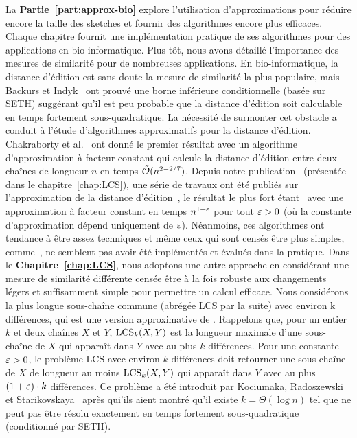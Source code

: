 La \textbf{Partie~\ref{part:approx-bio}} explore l'utilisation d'approximations pour réduire encore la taille des sketches et fournir des algorithmes encore plus efficaces. Chaque chapitre fournit une implémentation pratique de ses algorithmes pour des applications en bio-informatique.
%
Plus tôt, nous avons détaillé l'importance des mesures de similarité pour de nombreuses applications.
%
En bio-informatique, la distance d'édition est sans doute la mesure de similarité la plus populaire, mais Backurs et Indyk~\cite{DBLP:conf/stoc/BackursI15} ont prouvé une borne inférieure conditionnelle (basée sur SETH) suggérant qu'il est peu probable que la distance d'édition soit calculable en temps fortement sous-quadratique.
%
La nécessité de surmonter cet obstacle a conduit à l'étude d'algorithmes approximatifs pour la distance d'édition. Chakraborty et al.~\cite{DBLP:conf/focs/ChakrabortyDGKS18} ont donné le premier résultat  avec un algorithme d'approximation à facteur constant qui calcule la distance d'édition entre deux chaînes de longueur $n$ en temps $\tilde{\mathcal{O}}(n^{2-2/7})$.
Depuis notre publication~\cite{DBLP:conf/cpm/GourdelKRS20} (présentée dans le chapitre~\ref{chap:LCS}), une série de travaux ont été publiés sur l'approximation de la distance d'édition~\cite{brakensiek2020constant,koucky2020constant}, le résultat le plus fort étant~\cite{andoni2020edit} avec une approximation à facteur constant en temps $n^{1+\varepsilon}$ pour tout $\varepsilon>0$ (où la constante d'approximation dépend uniquement de $\varepsilon$).
Néanmoins, ces algorithmes ont tendance à être assez techniques et même ceux qui sont censés être plus simples, comme~\cite{andoni2020simple}, ne semblent pas avoir été implémentés et évalués dans la pratique.
%
Dans le \textbf{Chapitre~\ref{chap:LCS}}, nous adoptons une autre approche en considérant une mesure de similarité différente censée être à la fois robuste aux  changements légers et suffisamment simple pour permettre un calcul efficace. Nous considérons la plus longue sous-chaîne commune (abrégée LCS par la suite) avec environ k différences, qui est une version approximative de \kLCS. Rappelons que, pour un entier $k$ et deux chaînes $X$ et $Y$, $\mathrm{LCS}_{k}(X,Y)$ est la longueur maximale d'une sous-chaîne de $X$ qui apparaît dans $Y$ avec au plus $k$ différences.
Pour une constante $\varepsilon > 0$, le problème LCS avec environ $k$ différences doit retourner une sous-chaîne de $X$ de longueur au moins $\mathrm{LCS}_{k}(X,Y)$ qui apparaît dans $Y$ avec au plus $(1+\varepsilon) \cdot k$ différences. Ce problème a été introduit par Kociumaka, Radoszewski et Starikovskaya~\cite{DBLP:journals/algorithmica/KociumakaRS19} après qui'ils aient montré qu'il existe $k=\Theta(\log n)$ tel que \kLCS ne peut pas être résolu exactement en temps fortement sous-quadratique (conditionné par SETH).
